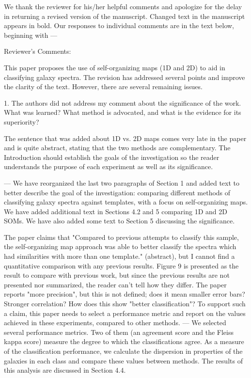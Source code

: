 We thank the reviewer for his/her helpful comments and apologize for the delay in returning a revised version of the manuscript. Changed text in the manuscript appears in bold. Our responses to individual comments are in the text below, beginning with ---



Reviewer's Comments:

This paper proposes the use of self-organizing maps (1D and 2D) to aid in classifying galaxy spectra.  The revision has addressed several points and improve the clarity of the text.  However, there are several remaining issues.

1. The authors did not address my comment about the significance of the work.  What was learned?  What method is advocated, and what is the evidence for its superiority?

The sentence that was added about 1D vs. 2D maps comes very late in the paper and is quite abstract, stating that the two methods are complementary.  The Introduction should establish the goals of the investigation so the reader understands the purpose of each experiment as well as its significance.

--- We have reorganized the last two paragraphs of Section 1 and added text to better describe the goal of the investigation: comparing different methods of classifying galaxy spectra against templates, with a focus on self-organizing maps. We have added additional text in Sections 4.2 and 5 comparing 1D and 2D SOMs.
We have also added some text to Section 5 discussing the significance. 


The paper claims that "Compared to previous attempts to classify this sample, the self-organizing map approach was able to better classify the spectra which had similarities with more than one template." (abstract), but I cannot find a quantitative comparison with any previous results.  Figure 9 is presented as the result to compare with previous work, but since the previous results are not presented nor summarized, the reader can't tell how they differ.  The paper reports "more precision", but this is not defined; does it mean smaller error bars?  Stronger correlation?  How does this show "better classification"?  To support such a claim, this paper needs to select a performance metric and report on the values achieved in these experiments, compared to other methods.
--- We selected several performance metrics. Two of them (an agreement score and the Fleiss kappa score) measure the degree to which the classifications agree. As a measure of the classification performance, we calculate the dispersion in properties of the galaxies in each class and compare these values between methods. The results of this analysis are discussed in Section 4.4.

